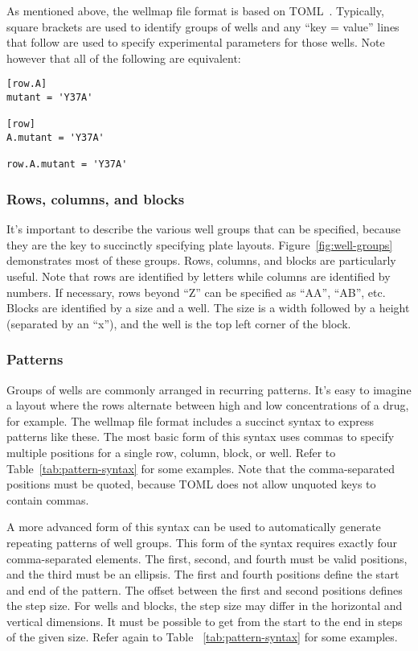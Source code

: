 \documentclass{bmcart}
\begin{document}
As mentioned above, the wellmap file format is based on
TOML~\cite{preston-werner2020}.  Typically, square brackets are used to
identify groups of wells and any ``key = value'' lines that follow are used to
specify experimental parameters for those wells.  Note however that all of the
following are equivalent:

\begin{lstlisting}
[row.A]
mutant = 'Y37A'

[row]
A.mutant = 'Y37A'

row.A.mutant = 'Y37A'
\end{lstlisting}


\subsubsection*{Rows, columns, and blocks}

It's important to describe the various well groups that can be specified,
because they are the key to succinctly specifying plate layouts.
Figure~\ref{fig:well-groups} demonstrates most of these groups. Rows, columns,
and blocks are particularly useful. Note that rows are identified by letters
while columns are identified by numbers. If necessary, rows beyond ``Z'' can be
specified as ``AA'', ``AB'', etc. Blocks are identified by a size and a well.
The size is a width followed by a height (separated by an ``x''), and the well
is the top left corner of the block.

\subsubsection*{Patterns}

Groups of wells are commonly arranged in recurring patterns. It's easy to
imagine a layout where the rows alternate between high and low concentrations
of a drug, for example. The wellmap file format includes a succinct syntax to
express patterns like these. The most basic form of this syntax uses commas to
specify multiple positions for a single row, column, block, or well. Refer to
Table~\ref{tab:pattern-syntax} for some examples. Note that the comma-separated
positions must be quoted, because TOML does not allow unquoted keys to contain
commas.

A more advanced form of this syntax can be used to automatically generate
repeating patterns of well groups. This form of the syntax requires exactly
four comma-separated elements. The first, second, and fourth must be valid
positions, and the third must be an ellipsis. The first and fourth positions
define the start and end of the pattern. The offset between the first and
second positions defines the step size.  For wells and blocks, the step size
may differ in the horizontal and vertical dimensions. It must be possible to
get from the start to the end in steps of the given size. Refer again to Table
~\ref{tab:pattern-syntax} for some examples.
\end{document}
